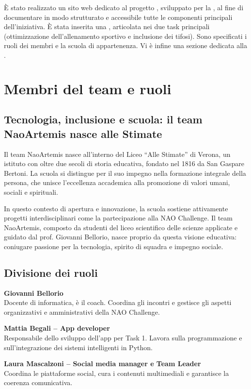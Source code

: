 \documentclass{optica-article}
\begin{document}
 È stato realizzato un sito web dedicato al progetto , sviluppato per la , al fine di documentare in modo strutturato e accessibile tutte le componenti principali dell’iniziativa. È  stata inserita una , articolata nei due task principali (ottimizzazione dell’allenamento sportivo e inclusione dei tifosi). Sono specificati i ruoli dei membri e la scuola di appartenenza. Vi è infine una sezione dedicata alla .
\bigskip
\section{Membri del team e ruoli}

\subsection{Tecnologia, inclusione e scuola: il team NaoArtemis nasce alle Stimate}
Il team NaoArtemis nasce all'interno del Liceo “Alle Stimate” di Verona, un istituto con oltre due secoli di storia educativa, fondato nel 1816 da San Gaspare Bertoni. La scuola si distingue per il suo impegno nella formazione integrale della persona, che unisce l’eccellenza accademica alla promozione di valori umani, sociali e spirituali.

In questo contesto di apertura e innovazione, la scuola sostiene attivamente progetti interdisciplinari come la partecipazione alla NAO Challenge. Il team NaoArtemis, composto da studenti del liceo scientifico delle scienze applicate e guidato dal prof. Giovanni Bellorio, nasce proprio da questa visione educativa: coniugare passione per la tecnologia, spirito di squadra e impegno sociale.

\subsection{Divisione dei ruoli}
\textbf{Giovanni Bellorio} \\Docente di informatica, \`e il coach. Coordina gli incontri e gestisce gli aspetti organizzativi e amministrativi della NAO Challenge.

\textbf{Mattia Begali -- App developer} \\Responsabile dello sviluppo dell’app per Task 1. Lavora sulla programmazione e sull'integrazione dei sistemi intelligenti in Python.

\textbf{Laura Mascalzoni -- Social media manager e Team Leader} \\Coordina le piattaforme social, cura i contenuti multimediali e garantisce la coerenza comunicativa.
\end{document}
